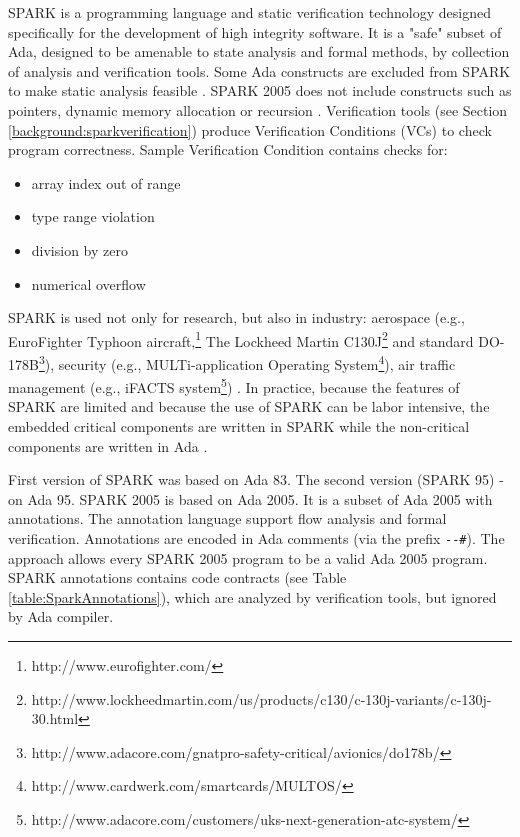 SPARK is a programming language and static verification technology designed specifically for the development of high integrity software. It is a "safe" subset of Ada, designed to be amenable to state analysis and formal methods, by collection of analysis and verification tools. Some Ada constructs are excluded from SPARK to make static analysis feasible \cite{Spark:Article}. SPARK 2005 does not include constructs such as pointers, dynamic memory allocation or recursion \cite{Spark:Article}. Verification tools (see Section \ref{background:sparkverification}) produce Verification Conditions (VCs) to check program correctness. Sample Verification Condition contains checks for:
\begin{itemize} \itemsep1pt \parskip0pt 
    \item array index out of range
    \item type range violation
    \item division by zero
    \item numerical overflow
\end{itemize}

SPARK is used not only for research, but also in industry: aerospace (e.g., EuroFighter Typhoon aircraft,\footnote{http://www.eurofighter.com/} The Lockheed Martin C130J\footnote{http://www.lockheedmartin.com/us/products/c130/c-130j-variants/c-130j-30.html} and standard DO-178B\footnote{http://www.adacore.com/gnatpro-safety-critical/avionics/do178b/}), security (e.g., MULTi-application Operating System\footnote{http://www.cardwerk.com/smartcards/MULTOS/}), air traffic management (e.g., iFACTS system\footnote{http://www.adacore.com/customers/uks-next-generation-atc-system/}) \cite{Barnes:Book}. In practice, because the features of SPARK are limited and because the use of SPARK can be labor intensive, the embedded critical components are written in SPARK while the non-critical components are written in Ada \cite{Spark:IndustrialExp}.

First version of SPARK was based on Ada 83. The second version (SPARK 95) - on Ada 95. SPARK 2005 is based on Ada 2005. It is a subset of Ada 2005 with annotations. The annotation language support flow analysis and formal verification. Annotations are encoded in Ada comments (via the prefix \lstinline{--#}). The approach allows every SPARK 2005 program to be a valid Ada 2005 program. SPARK annotations contains code contracts (see Table \ref{table:SparkAnnotations}), which are analyzed by verification tools, but ignored by Ada compiler.

